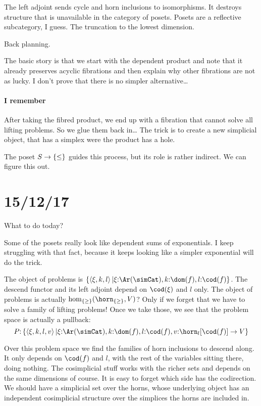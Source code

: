 \documentclass[csh.tex]{subfiles}
\begin{document}
The left adjoint sends cycle and horn inclusions to isomorphisms. It destroys structure that is unavailable in the category of posets.
Posets are a reflective subcategory, I guess. The truncation to the lowest dimension.

Back planning.

The basic story is that we start with the dependent product and note that it already preserves acyclic fibrations and then explain why other fibrations are not as lucky. I don't prove that there is no simpler alternative\dots

\paragraph{I remember}
After taking the fibred product, we end up with a fibration that cannot solve all lifting problems. So we glue them back in\dots
The trick is to create a new simplicial object, that has a simplex were the product has a hole.

The poset $S\to\left\{\leq\right\}$ guides this process, but its role is rather indirect. We can figure this out.

\section{15/12/17}
What to do today?

Some of the posets really look like dependent sums of exponentials. I keep struggling with that fact, because it keeps looking like a simpler exponential will do the trick.

The object of problems is $\set{ \tuplet{\xi,k,l} | \xi\of\Ar(\simCat), k\of \dom(f), l\of\cod(f) }$.
The descend functor and its left adjoint depend on $\cod(\xi)$ and $l$ only.
The object of problems is actually $\hom_{\set\geq}(\horn_{\set\geq},V)$? Only if we forget that we have to solve a family of lifting problems!
Once we take those, we see that the problem space is actually a pullback:
\[ P\of \set{ \tuplet{\xi,k,l,v} | \xi\of\Ar(\simCat), k\of \dom(f), l\of\cod(f), v\of\horn_l[\cod(f)]\to V } \]

Over this problem space we find the families of horn inclusions to descend along. It only depends on $\cod(f)$ and $l$, with the rest of the variables sitting there, doing nothing.
The cosimplicial stuff works with the richer sets and depends on the same dimensions of course. It is easy to forget which side has the codirection.
We should have a simplicial set over the horns, whose underlying object has an independent cosimplicial structure over the simplices the horns are included in.
\end{document}
